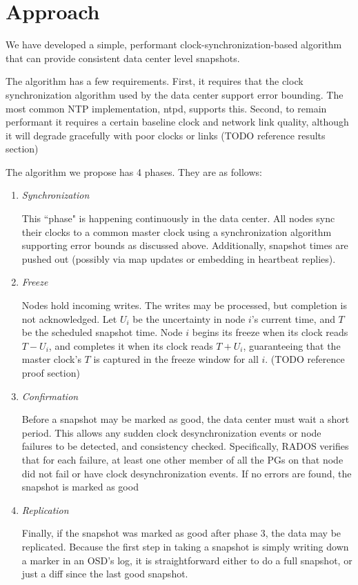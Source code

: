 \chapter{Approach}
\label{sec:approach}

We have developed a simple, performant clock-synchronization-based
algorithm that can provide consistent data center level snapshots.

The algorithm has a few requirements. First, it requires that the
clock synchronization algorithm used by the data center support error
bounding. The most common NTP implementation, ntpd, supports
this. Second, to remain performant it requires a certain baseline
clock and network link quality, although it will degrade gracefully
with poor clocks or links (TODO reference results section)

The algorithm we propose has 4 phases. They are as follows:

\begin{enumerate}

\item \emph{Synchronization}

  This ``phase" is happening continuously in the data center. All nodes
  sync their clocks to a common master clock using a synchronization
  algorithm supporting error bounds as discussed above. Additionally,
  snapshot times are pushed out (possibly via map updates or embedding
  in heartbeat replies).

\item \emph{Freeze}
  
  Nodes hold incoming writes. The writes may be processed, but
  completion is not acknowledged. Let $U_i$ be the uncertainty in node
  $i$'s current time, and $T$ be the scheduled snapshot time. Node $i$
  begins its freeze when its clock reads $T - U_i$, and completes it
  when its clock reads $T + U_i$, guaranteeing that the master clock's
  $T$ is captured in the freeze window for all $i$. (TODO reference
  proof section)

\item \emph{Confirmation}

  Before a snapshot may be marked as good, the data center must wait a
  short period. This allows any sudden clock desynchronization events
  or node failures to be detected, and consistency
  checked. Specifically, RADOS verifies that for each failure, at
  least one other member of all the PGs on that node did not fail or
  have clock desynchronization events. If no errors are found, the
  snapshot is marked as good

\item \emph{Replication}
  
  Finally, if the snapshot was marked as good after phase 3, the data
  may be replicated. Because the first step in taking a snapshot is
  simply writing down a marker in an OSD's log, it is straightforward
  either to do a full snapshot, or just a diff since the last good
  snapshot.

\end{enumerate}
